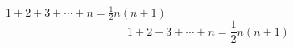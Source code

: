 \documentclass{article}
\begin{document}
$1+2+3+\cdots+n=\frac{1}{2}n(n+1)$
\[1+2+3+\cdots+n=\frac{1}{2}n(n+1)\]
\end{document}
